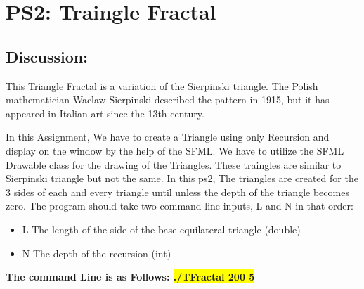 \section{PS2: Traingle Fractal}\label{sec:ps2}
\graphicspath{{ps2}}
\subsection{Discussion:}\label{sec:ps2:disc}
This Triangle Fractal is a variation of the Sierpinski triangle. The Polish mathematician Waclaw Sierpinski
described the pattern in 1915, but it has appeared in Italian art since the 13th century.

In this Assignment, We have to create a Triangle using only Recursion and display on the window by the help of the SFML.
We have to utilize the SFML Drawable class for the drawing of the Triangles. These traingles are similar to Sierpinski triangle but not the same. In this ps2, The triangles are created for the 3 sides of each and every triangle until unless the depth of the triangle becomes zero. The program should take two command line inputs, L and  N in that order:
\begin{itemize}
    \item L The length of the side of the base equilateral triangle (double)
    \item N The depth of the recursion (int)
\end{itemize}
\textbf{The command Line is as Follows: \newline
\colorbox{yellow}{./TFractal 200 5 } }

